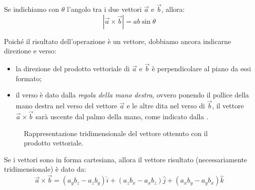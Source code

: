 \documentclass[a4paper,11pt,italian]{article}
\begin{document}
\begin{description}
  Se indichiamo con $ \theta $ l'angolo tra i due vettori $ \vec{a} $ e $ \vec{b} $, allora: 
  \[ | \vec{a} \times \vec{b} | = ab\sin\theta \]

  Poiché il risultato dell'operazione è un vettore, dobbiamo ancora indicarne direzione e verso:
  \begin{itemize}
    \item la direzione del prodotto vettoriale di $ \vec{a} $ e $ \vec{b} $ è perpendicolare al piano da essi formato;
    \item il verso è dato dalla \emph{regola della mano destra}, ovvero ponendo il pollice della mano destra nel verso del vettore $ \vec{a} $ e le altre dita nel verso di $ \vec{b} $, il vettore $ \vec{a} \times \vec{b} $ sarà uscente dal palmo della mano, come indicato dalla .
  \end{itemize}
  
\begin{figure}[htb]\centering
{}\caption{Rappresentazione tridimensionale del vettore ottenuto con il prodotto vettoriale.}
\label{img:vettoriale2}
\end{figure}

Se i vettori sono in forma cartesiana, allora il vettore risultato (necessariamente tridimensionale) è dato da: 
\[ \vec{a} \times \vec{b} = (a_y b_z - a_z b_y)\hat{i} + (a_z b_x - a_x b_z)\hat{j} + (a_x b_y - a_y b_x)\hat{k} \]
~\\~\\~\\~\\~
\end{description}

\newpage
\end{document}
